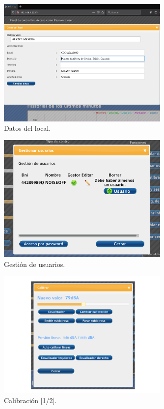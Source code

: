 \begin{figure}[ht]
    \centering
    \includegraphics[width=0.75\textwidth]{imagenes/interfaz/Interfaz_5_datos_local.png}
    \caption{Datos del local.}
\end{figure}

\begin{figure}[ht]
    \centering
    \includegraphics[width=0.75\textwidth]{imagenes/interfaz/Interfaz_6_usuarios_0.png}
    \caption{Gestión de usuarios.}
\end{figure}

\begin{figure}[ht]
    \centering
    \includegraphics[width=0.75\textwidth]{imagenes/interfaz/Interfaz_7_calibrar_0.png}
    \caption{Calibración [1/2].}
	\label{img:lms7-calibrate}
\end{figure}

